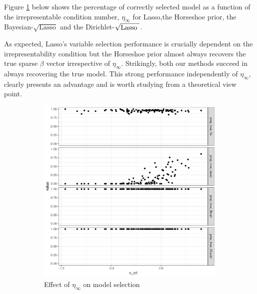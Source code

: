 \documentclass[10pt]{article}
\def\sql{$\sqrt{\text{Lasso}}$}
\def\sqdl{Dirichlet-$\sqrt{\text{\rm{Lasso} }}$}
\begin{document}
Figure \ref{fig:profile:MSP_irrep} below shows the percentage of correctly selected model as a function of the irrepresentable condition number, $\eta_\infty$ for Lasso,the Horseshoe prior, the Bayesian-\sql{} and the \sqdl{}.

As expected, Lasso's variable selection performance is crucially dependent on the irrepresentability condition but the Horseshoe prior almost always recovers the true sparse $\beta$ vector irrespective of $\eta_\infty$. Strikingly, both our methods succeed in always recovering the true model. This strong performance independently of  $\eta_\infty$, clearly presents an advantage and is worth studying from a theoretical view point.

\begin{figure}[ht!]%
\centering
\begin{subfigure}[t]{0.45\textwidth}
\centering
\includegraphics[width=\columnwidth]{Irrep_model_selec_n100p60_q50_2groups}%
\caption{Effect of $\eta_{\infty}$ on model selection}%
\label{fig:profile:MSP_irrep}%
\end{subfigure}
\begin{subfigure}[t]{0.45\textwidth}
\centering

\end{subfigure}
\end{figure}
\end{document}
